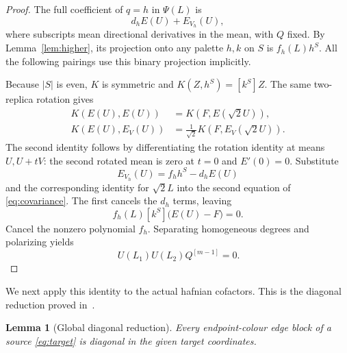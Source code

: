\documentclass[11pt]{article}
\newtheorem{lemma}[theorem]{Lemma}
\theoremstyle{definition}
\theoremstyle{plain}
\numberwithin{equation}{section}
\begin{document}
\begin{proof}
The full coefficient of \(q=h\) in \(\Psi(L)\) is
\[
 d_h E(U)+E_{V_h}(U),
\]
where subscripts mean directional derivatives in the mean, with \(Q\)
fixed. By Lemma~\ref{lem:higher}, its projection onto any palette \(h,k\)
on \(S\) is \(f_h(L)h^S\). All the following pairings use this binary
projection implicitly.

Because \(|S|\) is even, \(K\) is symmetric and \(K(Z,h^S)=[k^S]Z\).
The same two-replica rotation gives
\begin{equation}
 \begin{aligned}
 K(E(U),E(U))&=K(F,E(\sqrt2U)),\\
 K(E(U),E_V(U))&=\frac{1}{\sqrt2}K(F,E_V(\sqrt2U)).
 \end{aligned}
 \tag{4}\label{eq:covariance}
\end{equation}
The second identity follows by differentiating the rotation identity at
means \(U,U+tV\): the second rotated mean is zero at \(t=0\) and
\(E'(0)=0\). Substitute
\[
 E_{V_h}(U)=f_hh^S-d_hE(U)
\]
and the corresponding identity for \(\sqrt2L\) into the second equation
of \eqref{eq:covariance}. The first cancels the \(d_h\) terms, leaving
\[
 f_h(L)[k^S]\bigl(E(U)-F\bigr)=0.
\]
Cancel the nonzero polynomial \(f_h\). Separating homogeneous degrees and
polarizing yields
\begin{equation}
 [k^S]\,U(L_1)U(L_2)Q^{[m-1]}=0.
 \tag{5}\label{eq:omission}
\end{equation}
\end{proof}

We next apply this identity to the actual hafnian cofactors. This is the
diagonal reduction proved in~\cite{diagonal}.

\begin{lemma}[Global diagonal reduction]\label{lem:diagonal}
Every endpoint-colour edge block of a source \eqref{eq:target} is diagonal
in the given target coordinates.
\end{lemma}
\end{document}
